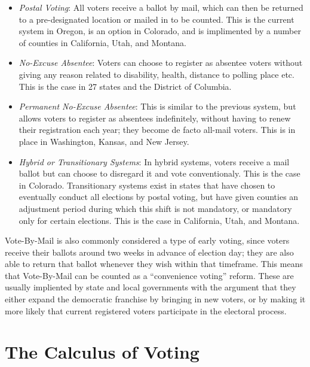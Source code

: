 \documentclass[12pt,twoside]{reedthesis}
\providecommand{\tightlist}{%
  \setlength{\itemsep}{0pt}\setlength{\parskip}{0pt}}
\begin{document}
  \begin{itemize}
  \tightlist
  \item
    \emph{Postal Voting}: All voters receive a ballot by mail, which can
    then be returned to a pre-designated location or mailed in to be
    counted. This is the current system in Oregon, is an option in
    Colorado, and is implimented by a number of counties in California,
    Utah, and Montana.\\
  \item
    \emph{No-Excuse Absentee}: Voters can choose to register as absentee
    voters without giving any reason related to disability, health,
    distance to polling place etc. This is the case in 27 states and the
    District of Columbia.\\
  \item
    \emph{Permanent No-Excuse Absentee}: This is similar to the previous
    system, but allows voters to register as absentees indefinitely,
    without having to renew their registration each year; they become de
    facto all-mail voters. This is in place in Washington, Kansas, and New
    Jersey.\\
  \item
    \emph{Hybrid or Transitionary Systems}: In hybrid systems, voters
    receive a mail ballot but can choose to disregard it and vote
    conventionaly. This is the case in Colorado. Transitionary systems
    exist in states that have chosen to eventually conduct all elections
    by postal voting, but have given counties an adjustment period during
    which this shift is not mandatory, or mandatory only for certain
    elections. This is the case in California, Utah, and Montana.
  \end{itemize}
  
  Vote-By-Mail is also commonly considered a type of early voting, since
  voters receive their ballots around two weeks in advance of election
  day; they are also able to return that ballot whenever they wish within
  that timeframe. This means that Vote-By-Mail can be counted as a
  ``convenience voting'' reform. These are usually impliented by state and
  local governments with the argument that they either expand the
  democratic franchise by bringing in new voters, or by making it more
  likely that current registered voters participate in the electoral
  process.
  
  \section{The Calculus of Voting}\label{the-calculus-of-voting}
  
\end{document}
